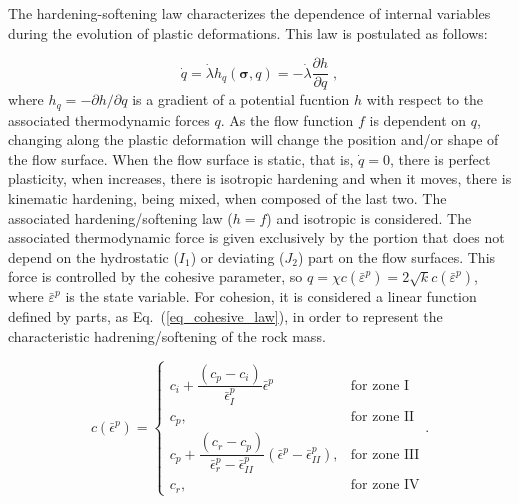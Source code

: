 \documentclass[Journal,letterpaper]{ascelike-new}
\newcommand{\hl}{{h_q}}
\newcommand{\strainpeq}{\bar \varepsilon^p}
\newcommand{\stress}{\boldsymbol{\sigma}}
\begin{document}
The hardening-softening law characterizes the dependence of internal variables during the evolution of plastic deformations. This law is postulated as follows:

\begin{equation} \label{eq_hardening_law}
	\dot q = \dot \lambda \hl(\stress,q) = - \dot \lambda \dfrac{\partial h}{\partial q}\;,
\end{equation}
where $\hl = -\partial h / \partial q$ is a gradient of a potential fucntion $h$ with respect to the associated thermodynamic forces $q$. As the flow function $f$ is dependent on $q$, changing along the plastic deformation will change the position and/or shape of the flow surface. When the flow surface is static, that is, $\dot q = 0$, there is perfect plasticity, when increases, there is isotropic hardening and when it moves, there is kinematic hardening, being mixed, when composed of the last two. The associated hardening/softening law ($h=f$) and isotropic is considered. The associated thermodynamic force is given exclusively by the portion that does not depend on the hydrostatic ($I_1$) or deviating ($J_2$) part on the flow surfaces. This force is controlled by the cohesive parameter, so $q = \chi c(\strainpeq) = 2\sqrt{k}c(\strainpeq)$, where $\strainpeq$ is the state variable. For cohesion, it is considered a linear function defined by parts, as Eq.~(\ref{eq_cohesive_law}), in order to represent the characteristic hadrening/softening of the rock mass.

\begin{equation} \label{eq_cohesive_law}
c (\bar \epsilon^p) = \left\{ 
\begin{array}{ll} 
	c_i + \dfrac{(c_p-c_i)}{\bar \epsilon^p_I}\bar \epsilon^p &  \text{for zone I} \\ 
	c_p, & \text{for zone II} \\
	c_p + \dfrac{(c_r-c_p)}{\bar \epsilon^p_r-\bar \epsilon^p_{II}}(\bar \epsilon^p - \bar \epsilon^p_{II}), & \text{for zone III} \\	
	c_r, & \text{for zone IV}
\end{array}\right..
\end{equation}
\end{document}
